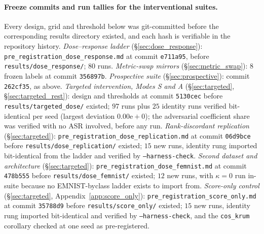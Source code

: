 \documentclass{article}
\begin{document}
\paragraph{Freeze commits and run tallies for the interventional suites.} Every design, grid and threshold below was git-committed before the corresponding results directory existed, and each hash is verifiable in the repository history. \emph{Dose--response ladder} (\S\ref{sec:dose_response}): \texttt{pre\_registration\_dose\_response.md} at commit \texttt{e711a95}, before \texttt{results/dose\_response/}; $80$ runs. \emph{Metric-swap mirrors} (\S\ref{sec:metric_swap}): $8$ frozen labels at commit \texttt{356897b}. \emph{Prospective suite} (\S\ref{sec:prospective}): commit \texttt{262cf35}, as above. \emph{Targeted intervention, Modes S and A} (\S\ref{sec:targeted}, \S\ref{sec:targeted_rest}): design and thresholds at commit \texttt{5130cec} before \texttt{results/targeted\_dose/} existed; $97$ runs plus $25$ identity runs verified bit-identical per seed (largest deviation $0.00\mathrm{e}{+}0$); the adversarial coefficient share was verified with no ASR involved, before any run. \emph{Rank-discordant replication} (\S\ref{sec:targeted}): \texttt{pre\_registration\_dose\_replication.md} at commit \texttt{06d9bce} before \texttt{results/dose\_replication/} existed; $15$ new runs, identity rung imported bit-identical from the ladder and verified by \texttt{--harness-check}. \emph{Second dataset and architecture} (\S\ref{sec:targeted}): \texttt{pre\_registration\_dose\_femnist.md} at commit \texttt{478b555} before \texttt{results/dose\_femnist/} existed; $12$ new runs, with $\kappa{=}0$ run in-suite because no EMNIST-byclass ladder exists to import from. \emph{Score-only control} (\S\ref{sec:targeted}, Appendix~\ref{app:score_only}): \texttt{pre\_registration\_score\_only.md} at commit \texttt{35788d9} before \texttt{results/score\_only/} existed; $15$ new runs, identity rung imported bit-identical and verified by \texttt{--harness-check}, and the \texttt{cos\_krum} corollary checked at one seed as pre-registered.
\end{document}
